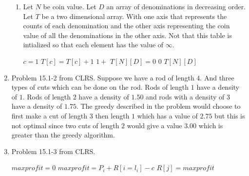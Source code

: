 \documentclass[letterpaper,11pt]{article}
\begin{document}
\begin{enumerate}
\begin{enumerate}
\item Let $N$ be coin value. Let $D$ an array of denominations in decreasing order. Let $T$ be a two dimensional array. With one axis that represents the counts of each denomination and the other axis representing the coin value of all the denominations in the other axis. Not that this table is intialized so that each element has the value of $\infty$.
\begin{algorithm}
\begin{algorithmic}[1]
\State $c = 1$
\State $T[c] = T[c] + 1$
\State \Return $1+$
\Else
\State  \Return {} 
\EndIf
\Else
\State $T[N][D] = 0$
\State \Return $0$
\EndIf
\EndFor
\Else
\State \Return $T[N][D]$
\EndIf
\EndFunction
\end{algorithmic}
\end{algorithm}
\end{enumerate}


\item Problem 15.1-2 from CLRS.
Suppose we have a rod of length 4. And three types of cuts which can be done on the rod. Rods of length $1$ have a density of $1$. Rods of length $2$ have a density of $1.50$ and rods with a density of $3$ have a density of $1.75$. The greedy described in the problem would choose to first make a cut of length $3$ then length $1$ which has a value of $2.75$ but this is not optimal since two cuts of length $2$ would give a value $3.00$ which is greater than the greedy algorithm.
\item Problem 15.1-3 from CLRS.
\begin{algorithm}
\begin{algorithmic}[1]
\State $maxprofit = 0$
\State $maxprofit = P_i + R[i=l_i] -c$
\EndIf
\EndFor
$R[j] = maxprofit$
\EndFor
\EndFunction
\end{algorithmic}
\end{algorithm}
\end{enumerate}
\end{document}
